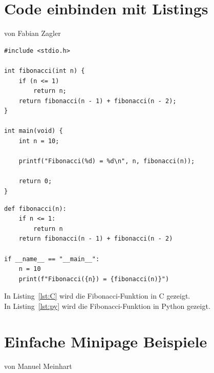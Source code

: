 \documentclass[twoside]{scrreprt}
\begin{document}

\cleardoublepage

\section{Code einbinden mit Listings}
{\large von Fabian Zagler}

\vspace{1 cm}

\begin{lstlisting}[style=cstyle, caption={Code Beispiel mit cstyle Stil}, label={lst:C}]
#include <stdio.h>

int fibonacci(int n) {
    if (n <= 1)
        return n;
    return fibonacci(n - 1) + fibonacci(n - 2);
}

int main(void) {
    int n = 10;

    printf("Fibonacci(%d) = %d\n", n, fibonacci(n));

    return 0;
}
\end{lstlisting}



\begin{lstlisting}[style=pystyle, captionpos=b, caption={Beispiel einer Fibonacci-Funktion in Python}, label={lst:py}]
def fibonacci(n):
    if n <= 1:
        return n
    return fibonacci(n - 1) + fibonacci(n - 2)

if __name__ == "__main__":
    n = 10
    print(f"Fibonacci({n}) = {fibonacci(n)}")
\end{lstlisting}


\vspace{1 cm}


\noindent
In Listing~\ref{lst:C} wird die Fibonacci-Funktion in C gezeigt.\\
In Listing~\ref{lst:py} wird die Fibonacci-Funktion in Python gezeigt.



\newpage

\section{Einfache Minipage Beispiele}  %
{\large von Manuel Meinhart}
\end{document}
